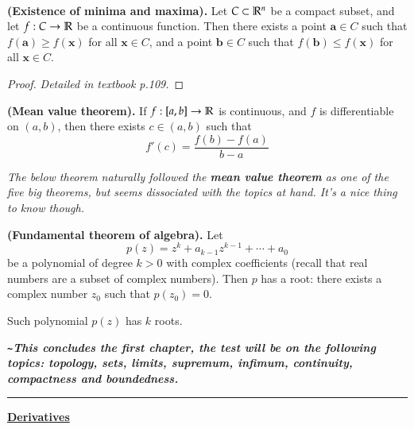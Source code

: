 \\

\begin{theorem}
  \textbf{(Existence of minima and maxima).} Let $C\subset \mathbb{R}^n$ be a compact subset, and let $f : C\rightarrow \mathbb{R}$ be a continuous function. Then there exists a point $\bm{a}\in C$ such that $f(\bm{a})\geq f(\bm{x})$ for all $\bm{x}\in C$, and a point $\bm{b}\in C$ such that $f(\bm{b})\leq f(\bm{x})$ for all $\bm{x}\in C$.
\end{theorem}
\begin{proof}
  \textit{Detailed in textbook p.109. }
\end{proof}

\begin{theorem}
	  \textbf{(Mean value theorem).} If $f : [a,b] \rightarrow \mathbb{R}$ is continuous, and $f$ is differentiable on $(a,b)$, then there exists $c\in (a,b)$ such that
  \[f'(c)=\frac{f(b)-f(a)}{b-a}\]
\end{theorem}

\emph{The below theorem naturally followed the \textbf{mean value theorem} as one of the five big theorems, but seems dissociated with the topics at hand. It's a nice thing to know though. }

\begin{theorem}
	  \textbf{(Fundamental theorem of algebra).} Let
  \[p(z)=z^k+a_{k-1}z^{k-1}+\cdots + a_0\]
  be a polynomial of degree $k > 0$ with complex coefficients (recall that real numbers are a subset of complex numbers). Then $p$ has a root: there exists a complex number $z_0$ such that $p(z_0)=0$. 
\end{theorem}

\begin{corollary}
	Such polynomial $p(z)$ has $k$ roots. 
\end{corollary}

\textbf{\emph{\texttt{\~}This concludes the first chapter, the test will be on the following topics: topology, sets, limits, supremum, infimum, continuity, compactness and boundedness.}}\\

\hrule

\textbf{\ul{Derivatives}}

